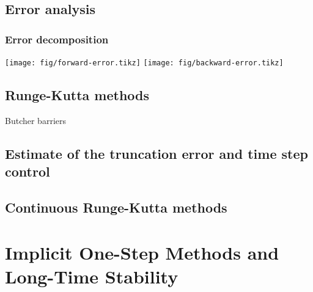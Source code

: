 \documentclass[ignorenonframetext,notheorems,aspectratio=1610]{beamer}
\begin{document}
\frame{}
\frame{}

\subsection{Error analysis}
\begin{frame}
  \frametitle{Error decomposition}
  \centering
  \texttt{[image: fig/forward-error.tikz]}
  \texttt{[image: fig/backward-error.tikz]}
\end{frame}

\frame{}
\frame{}
\frame{}
\frame{}

\subsection{Runge-Kutta methods}

\frame{}
\frame{}
\frame{}
\frame{}
\frame{}
\frame{}
\frame{}
\begin{frame}
  \begin{block}{Butcher barriers}
    
  \end{block}
\end{frame}

\subsection{Estimate of the truncation error and time step control}

\frame{}
\frame{}
\frame{}
\subsection{Continuous Runge-Kutta methods}

\frame{}
\frame{}


\section{Implicit One-Step Methods and Long-Time Stability}
\end{document}
